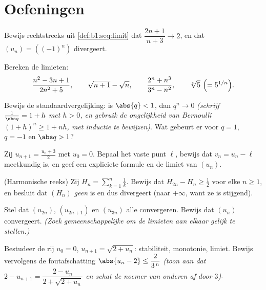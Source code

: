 \section{Oefeningen}

\begin{exercise}[$\star$]\label{exo:b1:seq:1}
Bewijs rechtstreeks uit \cref{def:b1:seq:limit} dat $\dfrac{2n+1}{n+3}
\to 2$, en dat $(u_n) = ((-1)^n)$ divergeert.
\end{exercise}

\begin{exercise}[$\star$]\label{exo:b1:seq:2}
Bereken de limieten:
\[
\frac{n^2 - 3n + 1}{2n^2 + 5},
\qquad
\sqrt{n+1} - \sqrt n,
\qquad
\frac{2^n + n^3}{3^n - n^2},
\qquad
\sqrt[n]{5}\ \Bigl(= 5^{1/n}\Bigr).
\]
\end{exercise}

\begin{exercise}[$\star$]\label{exo:b1:seq:3}
Bewijs de standaardvergelijking: is $\abs{q} < 1$, dan $q^n \to 0$
\emph{(schrijf $\frac{1}{\abs q} = 1 + h$ met $h > 0$, en gebruik de
ongelijkheid van Bernoulli $(1+h)^n \geq 1 + nh$, met inductie te
bewijzen)}. Wat gebeurt er voor $q = 1$, $q = -1$ en $\abs q > 1$?
\end{exercise}

\begin{exercise}[$\star$]\label{exo:b1:seq:4}
Zij $u_{n+1} = \frac{u_n + 3}{2}$ met $u_0 = 0$. Bepaal het vaste punt
$\ell$, bewijs dat $v_n = u_n - \ell$ meetkundig is, en geef een
expliciete formule en de limiet van $(u_n)$.
\end{exercise}

\begin{exercise}[$\star\star$]\label{exo:b1:seq:5}
(Harmonische reeks) Zij $H_n = \sum_{k=1}^{n} \frac 1k$. Bewijs dat
$H_{2n} - H_n \geq \frac12$ voor elke $n \geq 1$, en besluit dat $(H_n)$
\emph{geen}  is en dus divergeert (naar $+\infty$, want ze is
stijgend).
\end{exercise}

\begin{exercise}[$\star\star$]\label{exo:b1:seq:6}
Stel dat $(u_{2n})$, $(u_{2n+1})$ en $(u_{3n})$ alle convergeren. Bewijs
dat $(u_n)$ convergeert. \emph{(Zoek gemeenschappelijke  om de
limieten aan elkaar gelijk te stellen.)}
\end{exercise}

\begin{exercise}[$\star\star$]\label{exo:b1:seq:7}
Bestudeer de rij $u_0 = 0$, $u_{n+1} = \sqrt{2 + u_n}$: stabiliteit,
monotonie, limiet. Bewijs vervolgens de foutafschatting $\abs{u_n - 2}
\leq \dfrac{2}{3^{\,n}}$ \emph{(toon aan dat $2 - u_{n+1} = \dfrac{2 -
u_n}{2 + \sqrt{2 + u_n}}$ en schat de noemer van onderen af door $3$)}.
\end{exercise}

